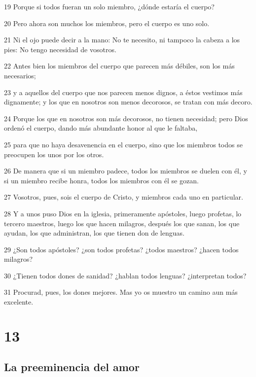 \par 19 Porque si todos fueran un solo miembro, ¿dónde estaría el cuerpo?
\par 20 Pero ahora son muchos los miembros, pero el cuerpo es uno solo.
\par 21 Ni el ojo puede decir a la mano: No te necesito, ni tampoco la cabeza a los pies: No tengo necesidad de vosotros.
\par 22 Antes bien los miembros del cuerpo que parecen más débiles, son los más necesarios;
\par 23 y a aquellos del cuerpo que nos parecen menos dignos, a éstos vestimos más dignamente; y los que en nosotros son menos decorosos, se tratan con más decoro.
\par 24 Porque los que en nosotros son más decorosos, no tienen necesidad; pero Dios ordenó el cuerpo, dando más abundante honor al que le faltaba,
\par 25 para que no haya desavenencia en el cuerpo, sino que los miembros todos se preocupen los unos por los otros.
\par 26 De manera que si un miembro padece, todos los miembros se duelen con él, y si un miembro recibe honra, todos los miembros con él se gozan.
\par 27 Vosotros, pues, sois el cuerpo de Cristo, y miembros cada uno en particular.
\par 28 Y a unos puso Dios en la iglesia, primeramente apóstoles, luego profetas, lo tercero maestros, luego los que hacen milagros, después los que sanan, los que ayudan, los que administran, los que tienen don de lenguas.
\par 29 ¿Son todos apóstoles? ¿son todos profetas? ¿todos maestros? ¿hacen todos milagros?
\par 30 ¿Tienen todos dones de sanidad? ¿hablan todos lenguas? ¿interpretan todos?
\par 31 Procurad, pues, los dones mejores. Mas yo os muestro un camino aun más excelente.

\chapter{13}

\section*{La preeminencia del amor}

